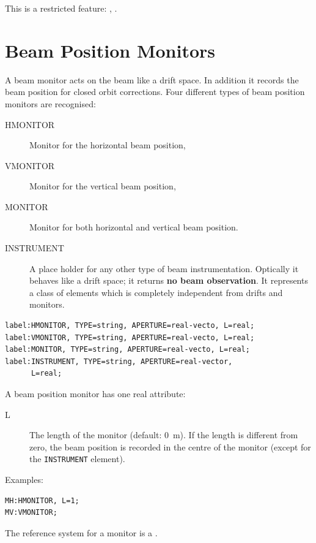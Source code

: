 This is a restricted feature: \noopalt, \noopalcycl .

\section{Beam Position Monitors}
\label{sec:monitors}
A beam monitor acts on the beam like a drift space.
In addition it records the beam position for closed orbit
corrections. 
Four different types of beam position monitors are recognised:
\begin{description}
\item[HMONITOR]
  \label{sec:hmonitor}
  Monitor for the horizontal beam position,
\item[VMONITOR]
  \label{sec:vmonitor}
  Monitor for the vertical beam position,
\item[MONITOR]
  \label{sec:monitor}
  Monitor for both horizontal and vertical beam position.
\item[INSTRUMENT]
  \label{sec:instrument}
  A place holder for any other type of beam instrumentation.
  Optically it behaves like a drift space;
  it returns \textbf{no beam observation}.
  It represents a class of elements
  which is completely independent from drifts and monitors.
\end{description}
\begin{verbatim}
label:HMONITOR, TYPE=string, APERTURE=real-vecto, L=real;
label:VMONITOR, TYPE=string, APERTURE=real-vecto, L=real;
label:MONITOR, TYPE=string, APERTURE=real-vecto, L=real;
label:INSTRUMENT, TYPE=string, APERTURE=real-vector, 
      L=real;
\end{verbatim}
A beam position monitor has one real attribute:
\begin{description}
\item[L]
  The length of the monitor (default: 0~m). 
  If the length is different from zero,
  the beam position is recorded in the centre of the monitor
  (except for the \texttt{INSTRUMENT} element).
\end{description}
\noindent Examples:
\begin{verbatim}
MH:HMONITOR, L=1;
MV:VMONITOR;
\end{verbatim}
The reference system for a monitor is a 
.
